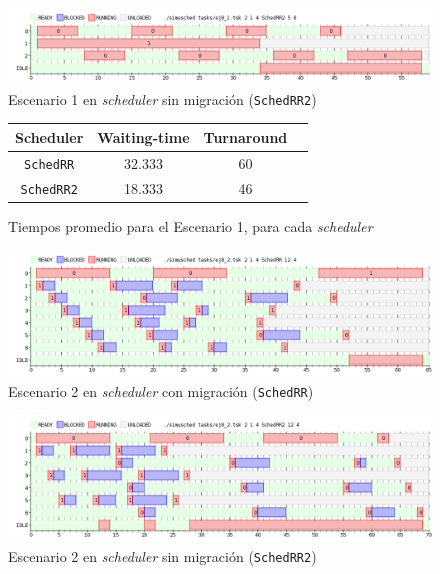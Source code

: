 \begin{figure}[H]
    \begin{center}
        \includegraphics[width=1\columnwidth]{imagenes/ej8_1_rr2.png}
        \caption{Escenario 1 en \emph{scheduler} sin migración (\texttt{SchedRR2})}
    \end{center}
\end{figure}

\begin{figure}[H]
    \begin{center}
        \begin{tabular}{|c|c|c|c|}
            \hline
            \textbf{Scheduler} & \textbf{Waiting-time} & \textbf{Turnaround} \\ \hline
            \texttt{SchedRR}   & 32.333 & 60 \\
            \texttt{SchedRR2}  & 18.333 & 46 \\ \hline
        \end{tabular}
        \caption{Tiempos promedio para el Escenario 1, para cada \emph{scheduler}}
    \end{center}
\end{figure}


\begin{figure}[H]
    \begin{center}
        \includegraphics[width=1\columnwidth]{imagenes/ej8_2_rr.png}
        \caption{Escenario 2 en \emph{scheduler} con migración (\texttt{SchedRR})}
    \end{center}
\end{figure}

\begin{figure}[H]
    \begin{center}
        \includegraphics[width=1\columnwidth]{imagenes/ej8_2_rr2.png}
        \caption{Escenario 2 en \emph{scheduler} sin migración (\texttt{SchedRR2})}
    \end{center}
\end{figure}

